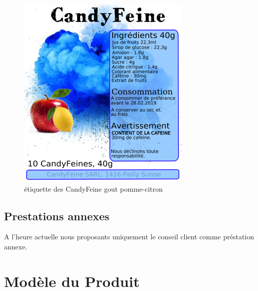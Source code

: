 \documentclass[12pt]{article}
\begin{document}
\begin{figure}[H]
\centering
   \caption{\label{étiquette} étiquette des CandyFeine gout pomme-citron}
   \includegraphics[scale=0.8]{../img/designEtiquettes_pommeCitron.png}
\end{figure}


\subsection{Prestations annexes}
A l'heure actuelle nous proposants uniquement le conseil client comme préstation annexe.

\section{Modèle du Produit}
\end{document}
